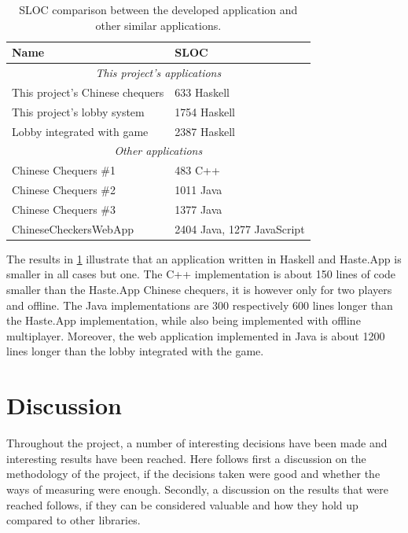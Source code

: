 \documentclass[a4paper]{article}
\begin{document}
\begin{table}[H]
    \centering
    \begin{tabular}{|l|l|}
        \hline
        \textbf{Name}  & \textbf{SLOC}                                      \\ \hline 
        \multicolumn{2}{|c|}{\textit{This project's applications}}          \\
        This project's Chinese chequers     & 633 Haskell                   \\ \hline
        This project's lobby system         & 1754 Haskell                  \\ \hline
        Lobby integrated with game          & 2387 Haskell                  \\ \hline 
        \multicolumn{2}{|c|}{\textit{Other applications}}                   \\
        Chinese Chequers \#1                & 483  C++                      \\ \hline
        Chinese Chequers \#2                & 1011 Java                     \\ \hline
        Chinese Chequers \#3                & 1377 Java                     \\ \hline
        ChineseCheckersWebApp               & 2404 Java, 1277 JavaScript    \\ \hline 
        
    \end{tabular}
    \caption{SLOC comparison between the developed application and other similar applications.}
    \label{tab:sloc-comparison}
\end{table}

The results in \cref{tab:sloc-comparison} illustrate that an application written in Haskell and Haste.App is smaller in all cases but one. The C++ implementation is about 150 lines of code smaller than the Haste.App Chinese chequers, it is however only for two players and offline. The Java implementations are 300 respectively 600 lines longer than the Haste.App implementation, while also being implemented with offline multiplayer. Moreover, the web application implemented in Java is about 1200 lines longer than the lobby integrated with the game.

\newpage
\section{Discussion}
Throughout the project, a number of interesting decisions have been made and interesting results have been reached. Here follows first a discussion on the methodology of the project, if the decisions taken were good and whether the ways of measuring were enough. Secondly, a discussion on the results that were reached follows, if they can be considered valuable and how they hold up compared to other libraries.
\end{document}
